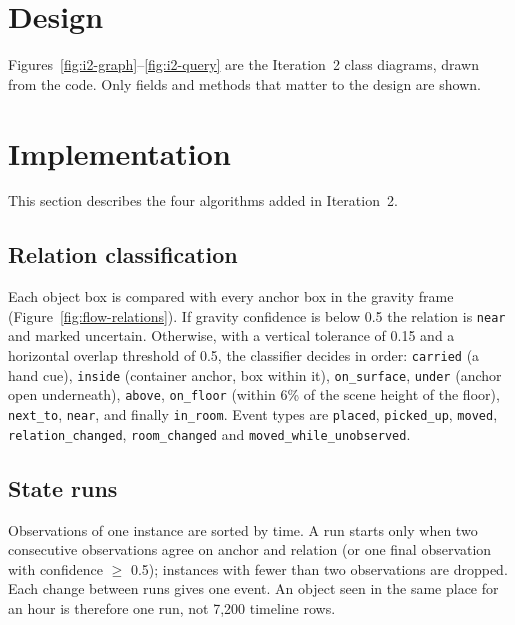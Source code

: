 \section{Design}
Figures~\ref{fig:i2-graph}--\ref{fig:i2-query} are the Iteration~2 class
diagrams, drawn from the code. Only fields and methods that matter to the design
are shown.


\clearpage
\section{Implementation}
This section describes the four algorithms added in Iteration~2.

\subsection{Relation classification}
\label{sec:relations-algo}
Each object box is compared with every anchor box in the gravity frame
(Figure~\ref{fig:flow-relations}). If gravity confidence is below 0.5 the
relation is \texttt{near} and marked uncertain. Otherwise, with a vertical
tolerance of 0.15 and a horizontal overlap threshold of 0.5, the classifier
decides in order: \texttt{carried} (a hand cue), \texttt{inside} (container
anchor, box within it), \texttt{on\_surface}, \texttt{under} (anchor open
underneath), \texttt{above}, \texttt{on\_floor} (within 6\% of the scene height
of the floor), \texttt{next\_to}, \texttt{near}, and finally \texttt{in\_room}.
Event types are \texttt{placed}, \texttt{picked\_up}, \texttt{moved},
\texttt{relation\_changed}, \texttt{room\_changed} and
\texttt{moved\_while\_unobserved}.


\subsection{State runs}
Observations of one instance are sorted by time. A run starts only when two
consecutive observations agree on anchor and relation (or one final observation
with confidence $\geq$ 0.5); instances with fewer than two observations are
dropped. Each change between runs gives one event. An object seen in the same
place for an hour is therefore one run, not 7{,}200 timeline rows.

